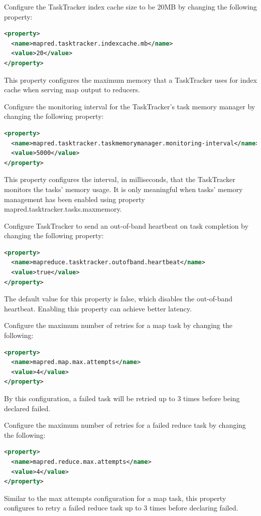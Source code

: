Configure the TaskTracker index cache size to be 20MB by changing the following property:
\lstset{style=bashstyle}
\begin{lstlisting}[language=XML]
<property>
  <name>mapred.tasktracker.indexcache.mb</name>
  <value>20</value>
</property>
\end{lstlisting}

This property configures the maximum memory that a TaskTracker uses for index cache when serving map output to reducers.

Configure the monitoring interval for the TaskTracker's task memory manager by changing the following property:
\lstset{style=bashstyle}
\begin{lstlisting}[language=XML]
<property>
  <name>mapred.tasktracker.taskmemorymanager.monitoring-interval</name>
  <value>5000</value>
</property>
\end{lstlisting}
This property configures the interval, in milliseconds, that the TaskTracker monitors the tasks' memory usage. It is only meaningful when tasks' memory management has been enabled using property mapred.tasktracker.tasks.maxmemory.

Configure TaskTracker to send an out-of-band heartbeat on task completion by changing the following property:
\lstset{style=bashstyle}
\begin{lstlisting}[language=XML]
<property>
  <name>mapreduce.tasktracker.outofband.heartbeat</name>
  <value>true</value>
</property>
\end{lstlisting}

The default value for this property is false, which disables the out-of-band heartbeat. Enabling this property can achieve better latency.

Configure the maximum number of retries for a map task by changing the following:
\lstset{style=bashstyle}
\begin{lstlisting}[language=XML]
<property>
  <name>mapred.map.max.attempts</name>
  <value>4</value>
</property>
\end{lstlisting}

By this configuration, a failed task will be retried up to 3 times before being declared failed.

Configure the maximum number of retries for a failed reduce task by changing the following:
\lstset{style=bashstyle}
\begin{lstlisting}[language=XML]
<property>
  <name>mapred.reduce.max.attempts</name>
  <value>4</value>
</property>
\end{lstlisting}
Similar to the max attempts configuration for a map task, this property configures to retry a failed reduce task up to 3 times before declaring failed.

